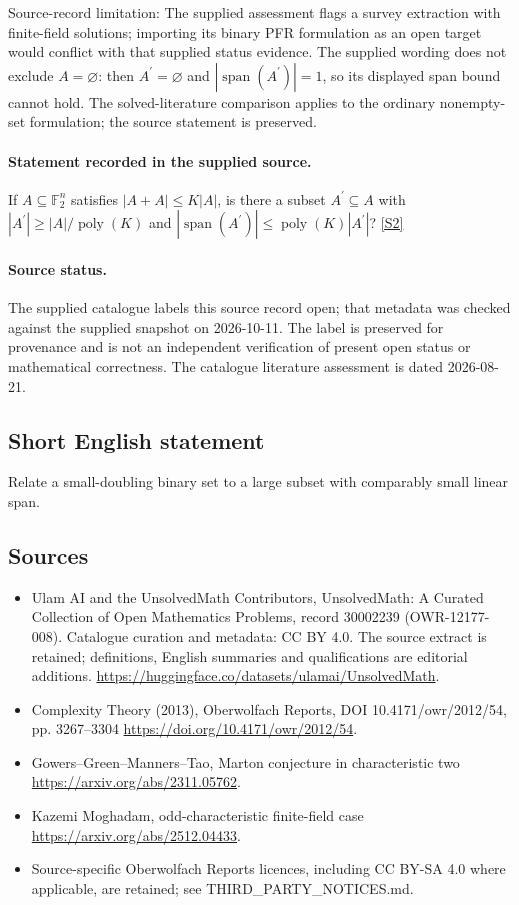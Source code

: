 \documentclass[11pt]{article}
\begin{document}
Source-record limitation: The supplied assessment flags a survey extraction with finite-field solutions; importing its binary PFR formulation as an open target would conflict with that supplied status evidence. The supplied wording does not exclude $A=\varnothing$: then $A^{\prime}=\varnothing$ and $|\operatorname{span}(A^{\prime})|=1$, so its displayed span bound cannot hold. The solved-literature comparison applies to the ordinary nonempty-set formulation; the source statement is preserved.
\paragraph{Statement recorded in the supplied source.}
If $A\subseteq\mathbb F_2^n$ satisfies $|A+A|\leq K|A|$, is there a subset $A^{\prime}\subseteq A$ with $|A^{\prime}|\geq |A|/\operatorname{poly}(K)$ and $|\operatorname{span}(A^{\prime})|\leq\operatorname{poly}(K)|A^{\prime}|$? \href{https://doi.org/10.4171/owr/2012/54}{[S2]}
\paragraph{Source status.}
The supplied catalogue labels this source record open; that metadata was checked against the supplied snapshot on 2026-10-11. The label is preserved for provenance and is not an independent verification of present open status or mathematical correctness. The catalogue literature assessment is dated 2026-08-21.
\subsection{Short English statement}
Relate a small-doubling binary set to a large subset with comparably small linear span.
\subsection{Sources}
\begin{itemize}
\item[S1] Ulam AI and the UnsolvedMath Contributors, UnsolvedMath: A Curated Collection of Open Mathematics Problems, record 30002239 (OWR-12177-008). Catalogue curation and metadata: CC BY 4.0. The source extract is retained; definitions, English summaries and qualifications are editorial additions.
\url{https://huggingface.co/datasets/ulamai/UnsolvedMath}.
\item[S2] Complexity Theory (2013), Oberwolfach Reports, DOI 10.4171/owr/2012/54, pp. 3267--3304
\url{https://doi.org/10.4171/owr/2012/54}.
\item[S3] Gowers--Green--Manners--Tao, Marton conjecture in characteristic two
\url{https://arxiv.org/abs/2311.05762}.
\item[S4] Kazemi Moghadam, odd-characteristic finite-field case
\url{https://arxiv.org/abs/2512.04433}.
\item Source-specific Oberwolfach Reports licences, including CC BY-SA 4.0 where applicable, are retained; see THIRD\_PARTY\_NOTICES.md.
\end{itemize}
\end{document}
